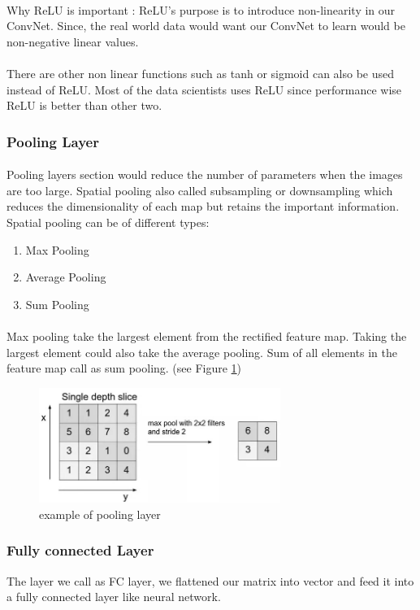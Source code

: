 \paragraph{}
Why ReLU is important : ReLU’s purpose is to introduce non-linearity in our ConvNet. Since, the real world data would want our ConvNet to learn would be non-negative linear values.
\paragraph{}
There are other non linear functions such as tanh or sigmoid can also be used instead of ReLU. Most of the data scientists uses ReLU since performance wise ReLU is better than other two.
\subsubsection{Pooling Layer}
\paragraph{}
Pooling layers section would reduce the number of parameters when the images are too large. Spatial pooling also called subsampling or downsampling which reduces the dimensionality of each map but retains the important information. Spatial pooling can be of different types:
\begin{enumerate}
	\item Max Pooling
	\item Average Pooling
	\item Sum Pooling
\end{enumerate}
\paragraph{}
Max pooling take the largest element from the rectified feature map. Taking the largest element could also take the average pooling. Sum of all elements in the feature map call as sum pooling. (see Figure \ref{pooling})
\begin{figure}[H]
	\centering
	\includegraphics[width=0.7\textwidth]{pooling_layer.jpg}
	\caption{example of pooling layer}
	\label{pooling}
\end{figure}
\subsubsection{Fully connected Layer}
The layer we call as FC layer, we flattened our matrix into vector and feed it into a fully connected layer like neural network.





